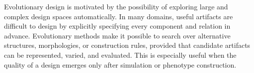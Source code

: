 



Evolutionary design is motivated by the possibility of exploring large and complex design spaces automatically. In many domains, useful artifacts are difficult to design by explicitly specifying every component and relation in advance. Evolutionary methods make it possible to search over alternative structures, morphologies, or construction rules, provided that candidate artifacts can be represented, varied, and evaluated. This is especially useful when the quality of a design emerges only after simulation or phenotype construction.

